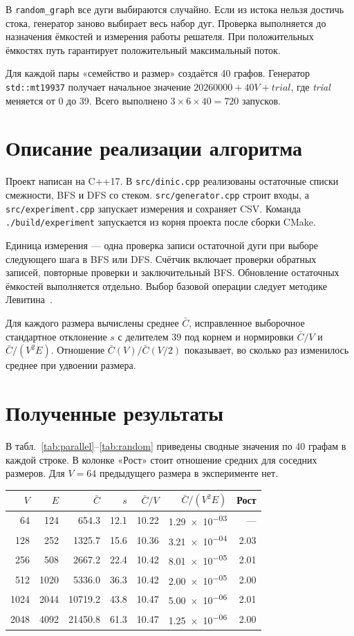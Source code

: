 \documentclass[14pt,a4paper]{extarticle}
\makeatletter
\newcommand{\reportfontsize}[1]{\fontsize{#1}{\f@baselineskip}\selectfont}
\newcommand{\family}[1]{\texttt{#1}}
\newenvironment{resulttable}[2]{%
  \par\noindent\begin{minipage}{\linewidth}\centering
  \captionof{table}{#1}\label{#2}
  \singlespacing
  \reportfontsize{12pt}
  \setlength{\tabcolsep}{8pt}
  \begin{tabular}{@{}rrrrrrr@{}}
  \toprule
  $V$ & $E$ & $\bar C$ & $s$ & $\bar C/V$ & $\bar C/(V^2 E)$ & Рост\\
  \midrule
}{%
  \bottomrule
  \end{tabular}
  \end{minipage}\par\smallskip
}
\newcommand{\resultrow}[7]{%
  #1 & #2 & \num{#3} & \num{#4} & \num{#5} & \num{#6} & #7\\
}
\makeatother
\begin{document}
В \family{random\_graph} все дуги выбираются случайно. Если из истока нельзя достичь стока, генератор заново выбирает весь набор дуг. Проверка выполняется до назначения ёмкостей и измерения работы решателя. При положительных ёмкостях путь гарантирует положительный максимальный поток.

Для каждой пары «семейство и размер» создаётся 40 графов. Генератор \texttt{std::mt19937} получает начальное значение $20260000 + 40V + \textit{trial}$, где \textit{trial} меняется от 0 до 39. Всего выполнено $3\times 6\times 40=720$ запусков.

\section{Описание реализации алгоритма}

Проект написан на C++17. В \texttt{src/dinic.cpp} реализованы остаточные списки смежности, BFS и DFS со стеком. \texttt{src/generator.cpp} строит входы, а \texttt{src/experiment.cpp} запускает измерения и сохраняет CSV. Команда \texttt{./build/experiment} запускается из корня проекта после сборки CMake.

Единица измерения --- одна проверка записи остаточной дуги при выборе следующего шага в BFS или DFS. Счётчик включает проверки обратных записей, повторные проверки и заключительный BFS. Обновление остаточных ёмкостей выполняется отдельно. Выбор базовой операции следует методике Левитина~\cite[§~2.6]{levitin}.

Для каждого размера вычислены среднее $\bar C$, исправленное выборочное стандартное отклонение $s$ с делителем 39 под корнем и нормировки $\bar C/V$ и $\bar C/(V^2E)$. Отношение $\bar C(V)/\bar C(V/2)$ показывает, во сколько раз изменилось среднее при удвоении размера.

\clearpage
\section{Полученные результаты}

В табл.~\ref{tab:parallel}--\ref{tab:random} приведены сводные значения по 40 графам в каждой строке. В колонке «Рост» стоит отношение средних для соседних размеров. Для $V=64$ предыдущего размера в эксперименте нет.

\begin{resulttable}{Параллельные пути (\family{parallel})}{tab:parallel}
\resultrow{64}{124}{654.3}{12.1}{10.22}{1.29e-03}{---}
\resultrow{128}{252}{1325.7}{15.6}{10.36}{3.21e-04}{\num{2.03}}
\resultrow{256}{508}{2667.2}{22.4}{10.42}{8.01e-05}{\num{2.01}}
\resultrow{512}{1020}{5336.0}{36.3}{10.42}{2.00e-05}{\num{2.00}}
\resultrow{1024}{2044}{10719.2}{43.8}{10.47}{5.00e-06}{\num{2.01}}
\resultrow{2048}{4092}{21450.8}{61.3}{10.47}{1.25e-06}{\num{2.00}}
\end{resulttable}
\end{document}

